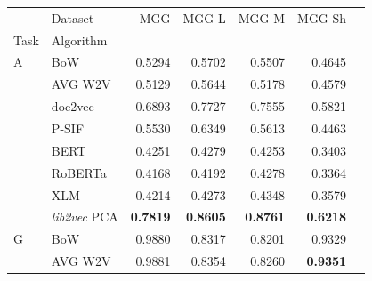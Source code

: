 \documentclass[11pt]{article}
\begin{document}
\renewcommand{\tabcolsep}{2.5pt}
\begin{table}[ht!]
	\centering
	\footnotesize
	\begin{tabular}{@{}L{0.5cm}lrrrrr@{}}
		\toprule
		& Dataset               & MGG             & MGG-L           & MGG-M           & MGG-Sh          \\
		Task & Algorithm             &                 &                 &                 &                 \\ \midrule
		A    & BoW                   & 0.5294          & 0.5702          & 0.5507          & 0.4645          \\
		& AVG W2V               & 0.5129          & 0.5644          & 0.5178          & 0.4579          \\
		& doc2vec               & 0.6893 & 0.7727 & 0.7555 & 0.5821 \\
		& P-SIF                 & 0.5530          & 0.6349          & 0.5613          & 0.4463          \\
		& BERT                  & 0.4251          & 0.4279          & 0.4253          & 0.3403          \\
		& RoBERTa               & 0.4168          & 0.4192          & 0.4278          & 0.3364          \\
		& XLM                   & 0.4214          & 0.4273          & 0.4348          & 0.3579          \\ 
		& \emph{lib2vec} PCA & \textbf{0.7819} & \textbf{0.8605} & \textbf{0.8761} & \textbf{0.6218} \\ \midrule
		G    & BoW                   & 0.9880          & 0.8317          & 0.8201          & 0.9329          \\
		& AVG W2V               & 0.9881          & 0.8354          & 0.8260          & \textbf{0.9351} \\

\end{tabular}
\end{table}
\end{document}

